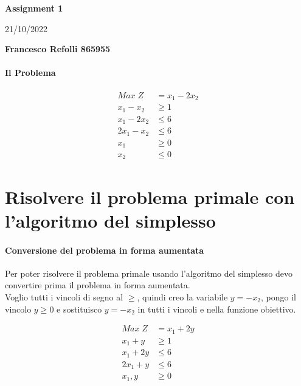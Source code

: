 \documentclass[a4paper,12pt,oneside]{article}
\begin{document}
    \thispagestyle{plain}
    \begin{center}
        \normalsize
        \textbf{Assignment 1}
            
        \vspace{0.2cm}
        \normalsize
        21/10/2022
            
        \vspace{0.2cm}
        \textbf{Francesco Refolli 865955}
    \end{center}

    \paragraph{Il Problema}
    
    \begin{align*}
        Max \; Z &= x_1 - 2 x_2 \\
        x_1 - x_2 & \geq 1 \\
        x_1 - 2 x_2 & \leq 6 \\
        2 x_1 - x_2 & \leq 6 \\
        x_1 & \geq 0 \\
        x_2 & \leq 0
    \end{align*}

    \section{Risolvere il problema primale con l’algoritmo del simplesso}

    \paragraph{Conversione del problema in forma aumentata}
    Per poter risolvere il problema primale usando l'algoritmo del simplesso devo convertire prima il problema in forma aumentata. \\
    Voglio tutti i vincoli di segno al $\geq$, quindi creo la variabile $y = - x_2$, pongo il vincolo $y \geq 0$ e sostituisco $y = -x_2$ in tutti i vincoli e nella funzione obiettivo.

    \begin{align*}
        Max \; Z &= x_1 + 2 y \\
        x_1 + y & \geq 1 \\
        x_1 + 2 y & \leq 6 \\
        2 x_1 + y & \leq 6 \\
        x_1, y & \geq 0
    \end{align*}
\end{document}
